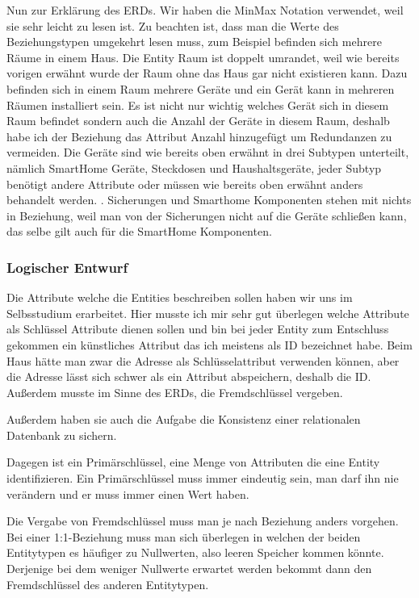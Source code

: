 \begin{flushleft}
Nun zur Erklärung des ERDs. Wir haben die MinMax Notation verwendet, weil sie sehr leicht zu lesen ist. Zu beachten ist, dass
man die Werte des Beziehungstypen umgekehrt lesen muss, zum Beispiel befinden sich mehrere Räume in einem Haus. Die Entity Raum ist doppelt umrandet, weil wie bereits vorigen erwähnt wurde der Raum ohne das Haus gar nicht existieren kann. Dazu befinden sich in einem Raum mehrere Geräte und ein Gerät kann in mehreren Räumen installiert sein. Es ist nicht nur wichtig welches Gerät sich in diesem Raum befindet sondern auch die Anzahl der Geräte in diesem Raum, deshalb habe ich der Beziehung das Attribut Anzahl hinzugefügt um Redundanzen zu vermeiden. Die Geräte sind wie bereits oben erwähnt in drei Subtypen unterteilt, nämlich SmartHome Geräte, Steckdosen und Haushaltsgeräte, jeder Subtyp benötigt andere Attribute oder müssen wie bereits oben erwähnt anders behandelt werden. . Sicherungen und Smarthome Komponenten  stehen mit nichts in Beziehung, weil man von der Sicherungen nicht auf die Geräte schließen kann, das selbe gilt auch für die SmartHome Komponenten.

\subsubsection{Logischer Entwurf}

Die Attribute welche die Entities beschreiben sollen haben wir uns im Selbsstudium erarbeitet. Hier musste ich mir sehr gut überlegen welche Attribute als Schlüssel Attribute dienen sollen und bin bei jeder Entity zum Entschluss gekommen ein künstliches Attribut das ich meistens als ID bezeichnet habe. Beim Haus hätte man zwar die Adresse als Schlüsselattribut verwenden können, aber die Adresse lässt sich schwer als ein Attribut abspeichern, deshalb die ID. Außerdem musste im Sinne des ERDs, die Fremdschlüssel vergeben.

Außerdem haben sie auch die Aufgabe die Konsistenz einer relationalen Datenbank zu sichern. 

Dagegen ist ein Primärschlüssel, eine Menge von Attributen die eine Entity identifizieren. Ein Primärschlüssel muss immer eindeutig sein, man darf ihn nie verändern und er muss immer einen Wert haben.

Die Vergabe von Fremdschlüssel muss man je nach Beziehung anders vorgehen. Bei einer 1:1-Beziehung muss man sich überlegen in welchen der beiden Entitytypen es häufiger zu Nullwerten, also leeren Speicher kommen könnte. Derjenige bei dem weniger Nullwerte erwartet werden bekommt dann den Fremdschlüssel des anderen Entitytypen.


\end{flushleft}
